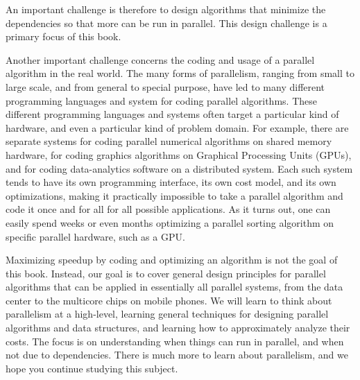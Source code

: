 \begin{gram}
\label{gr:intro::parallelism::software-challenge}
An important challenge is therefore to design algorithms that minimize
the dependencies so that more can be run in parallel.
%
This design challenge is a primary focus of this book. 

Another important challenge concerns the coding and usage of a
parallel algorithm in the real world.
%
The many forms of parallelism, ranging from small to large scale, and
from general to special purpose, have led to many different programming
languages and system for coding parallel algorithms.
%
These different programming languages and systems often target a
particular kind of hardware, and even a particular kind of problem
domain.  
%
For example, there are separate systems for coding parallel numerical
algorithms on shared memory hardware, for coding graphics algorithms
on Graphical Processing Units (GPUs), and for coding data-analytics
software on a distributed system.
%
Each such system tends to have its own programming interface, its own
cost model, and its own optimizations, making it practically
impossible to take a parallel algorithm and code it once and for all
for all possible applications.
%
As it turns out, one can easily spend weeks or even months optimizing a
parallel sorting algorithm on specific parallel hardware, such as a GPU.



Maximizing speedup by coding and optimizing an algorithm is not the
goal of this book.
%
Instead, our goal is to cover general design principles for parallel
algorithms that can be applied in essentially all parallel systems,
from the data center to the multicore chips on mobile phones.
%
We will learn to think about parallelism at a high-level, learning
general techniques for designing parallel algorithms and data
structures, and learning how to approximately analyze their costs.
%
The focus is on understanding when things can run in parallel, and
when not due to dependencies.  
%
There is much more to learn about parallelism, and we hope you
continue studying this subject.
\end{gram}

